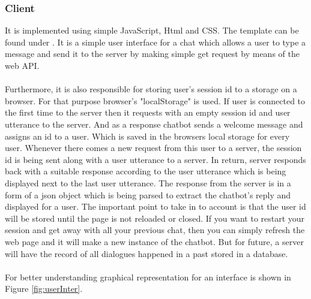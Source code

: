 \subsubsection*{Client}
It is implemented using simple JavaScript, Html and CSS. The template can be found under \cite{userinterface}. It is a simple user interface for a chat which allows a user to type a message and send it to the server by making simple get request by means of the web API. 
\\~\\
Furthermore, it is also responsible for storing user's session id to a storage on a browser. For that purpose browser's "localStorage" \cite{localstorage} is used. If user is connected to the first time to the server then it requests with an empty session id and user utterance to the server. And as a response chatbot sends a welcome message and assigns an id to a user. Which is saved in the browsers local storage for every user. Whenever there comes a new request from this user to a server, the session id is being sent along with a user utterance to a server. In return, server responds back with a suitable response according to the user utterance which is being displayed next to the last user utterance. The response from the server is in a form of a json object which is being parsed to extract the chatbot's reply and displayed for a user. The important point to take in to account is that the user id will be stored until the page is not reloaded or closed. If you want to restart your session and get away with all your previous chat, then you can simply refresh the web page and it will make a new instance of the chatbot. But for future, a server will have the record of all dialogues happened in a past stored in a database. 
\\~\\
For better understanding graphical representation for an interface is shown in Figure \ref{fig:userInter}.

